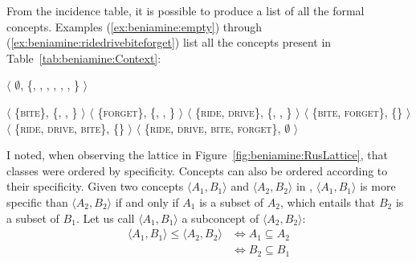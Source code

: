 \documentclass[output=paper]{langscibook}
\begin{document}
    From the incidence table, it is possible to produce a list of all the formal concepts. Examples (\ref{ex:beniamine:empty}) through (\ref{ex:beniamine:ridedrivebiteforget}) list all the concepts present in Table~\ref{tab:beniamine:Context}:

    \begin{exe}
        \ex \label{ex:beniamine:empty}
        \begin{sloppypar}
          $\langle$ $\emptyset$, \{, ,
          , , , ,  \} $\rangle$

        \end{sloppypar}
        \ex \label{ex:beniamine:bite} $\langle$ \{\textsc{bite}\},  \{, , \} $\rangle$
        \ex \label{ex:beniamine:forget} $\langle$ \{\textsc{forget}\},  \{, , \} $\rangle$
        \ex \label{ex:beniamine:ridedrive} $\langle$ \{\textsc{ride}, \textsc{drive}\},  \{, , \} $\rangle$
        \ex \label{ex:beniamine:biteforget} $\langle$ \{\textsc{bite}, \textsc{forget}\},  \{\} $\rangle$
        \ex \label{ex:beniamine:ridedrivebite} $\langle$ \{\textsc{ride}, \textsc{drive}, \textsc{bite}\},  \{\} $\rangle$
        \ex \label{ex:beniamine:ridedrivebiteforget} $\langle$ \{\textsc{ride}, \textsc{drive}, \textsc{bite}, \textsc{forget}\},  $\emptyset$ $\rangle$
    \end{exe}

    I noted, when observing the lattice in Figure~\ref{fig:beniamine:RusLattice}, that classes were ordered by specificity. Concepts can also be ordered according to their specificity. Given two concepts $\langle A_{1},B_{1} \rangle$ and $\langle A_{2},B_{2} \rangle$ in \context{}, $\langle A_{1},B_{1} \rangle$ is more specific than $\langle A_{2},B_{2} \rangle$ if and only if $A_{1}$ is a subset of $A_{2}$, which entails that $B_{2}$ is a subset of $B_{1}$. Let us call $\langle A_{1},B_{1} \rangle$ a subconcept of $\langle A_{2},B_{2} \rangle$:
    \begin{align*}
    \langle A_{1},B_{1} \rangle \leq \langle A_{2},B_{2} \rangle & \iff A_{1} \subseteq A_2\\
    & \iff B_{2} \subseteq B_1
    \end{align*}
\end{document}
